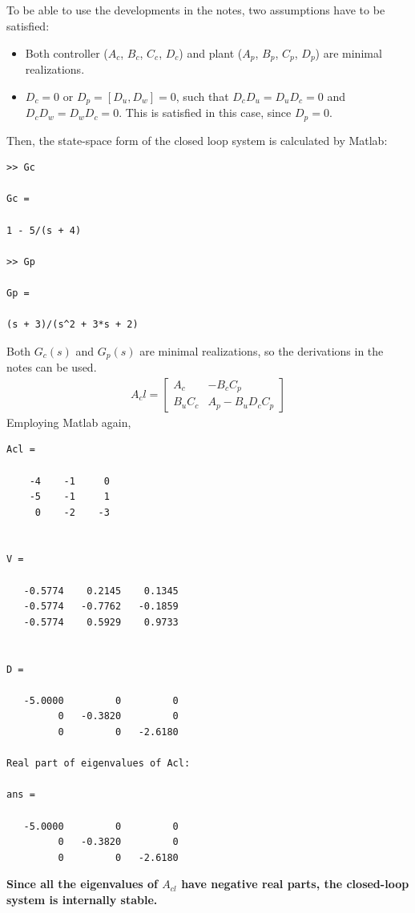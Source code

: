\subsection{}
To be able to use the developments in the notes, two assumptions have to be satisfied:
\begin{itemize}
    \item Both controller ($A_c$, $B_c$, $C_c$, $D_c$) and plant ($A_p$, $B_p$, $C_p$, $D_p$) are minimal realizations.
    \item $D_c= 0$ or $D_p = [D_u, D_w] = 0$, such that $D_c D_u = D_u D_c = 0$ and $D_c D_w = D_w D_c = 0$. This is satisfied in this case, since $D_p = 0$.
\end{itemize}
Then, the state-space form of the closed loop system is calculated by Matlab:
\begin{verbatim}
>> Gc
 
Gc =
 
1 - 5/(s + 4)
 
>> Gp
 
Gp =
 
(s + 3)/(s^2 + 3*s + 2)
\end{verbatim}

Both $G_c(s)$ and $G_p(s)$ are minimal realizations, so the derivations in the notes can be used.
\begin{align*}
    A_cl = \begin{bmatrix}
        A_c & -B_c C_p \\
        B_u C_c & A_p - B_u D_c C_p
    \end{bmatrix} 
\end{align*}
Employing Matlab again,
\begin{verbatim}
Acl =

    -4    -1     0
    -5    -1     1
     0    -2    -3


V =

   -0.5774    0.2145    0.1345
   -0.5774   -0.7762   -0.1859
   -0.5774    0.5929    0.9733


D =

   -5.0000         0         0
         0   -0.3820         0
         0         0   -2.6180

Real part of eigenvalues of Acl: 

ans =

   -5.0000         0         0
         0   -0.3820         0
         0         0   -2.6180
\end{verbatim}

\textbf{Since all the eigenvalues of $A_{cl}$ have negative real parts, the closed-loop system is internally stable.}

